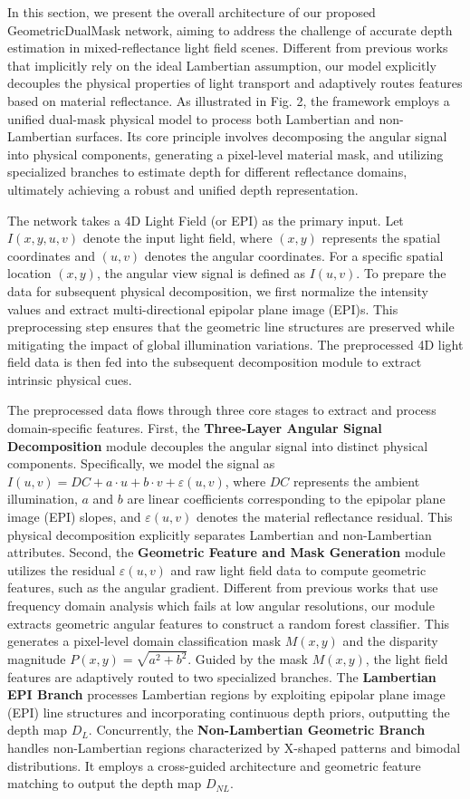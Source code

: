 \documentclass[lettersize,journal]{IEEEtran}
\begin{document}
In this section, we present the overall architecture of our proposed GeometricDualMask network, aiming to address the challenge of accurate depth estimation in mixed-reflectance light field scenes. Different from previous works that implicitly rely on the ideal Lambertian assumption, our model explicitly decouples the physical properties of light transport and adaptively routes features based on material reflectance. As illustrated in Fig. 2, the framework employs a unified dual-mask physical model to process both Lambertian and non-Lambertian surfaces. Its core principle involves decomposing the angular signal into physical components, generating a pixel-level material mask, and utilizing specialized branches to estimate depth for different reflectance domains, ultimately achieving a robust and unified depth representation.

The network takes a 4D Light Field (or EPI) as the primary input. Let $I(x,y,u,v)$ denote the input light field, where $(x,y)$ represents the spatial coordinates and $(u,v)$ denotes the angular coordinates. For a specific spatial location $(x,y)$, the angular view signal is defined as $I(u,v)$. To prepare the data for subsequent physical decomposition, we first normalize the intensity values and extract multi-directional epipolar plane image (EPI)s. This preprocessing step ensures that the geometric line structures are preserved while mitigating the impact of global illumination variations. The preprocessed 4D light field data is then fed into the subsequent decomposition module to extract intrinsic physical cues.

The preprocessed data flows through three core stages to extract and process domain-specific features. First, the \textbf{Three-Layer Angular Signal Decomposition} module decouples the angular signal into distinct physical components. Specifically, we model the signal as $I(u,v) = DC + a \cdot u + b \cdot v + \varepsilon(u,v)$, where $DC$ represents the ambient illumination, $a$ and $b$ are linear coefficients corresponding to the epipolar plane image (EPI) slopes, and $\varepsilon(u,v)$ denotes the material reflectance residual. This physical decomposition explicitly separates Lambertian and non-Lambertian attributes. Second, the \textbf{Geometric Feature and Mask Generation} module utilizes the residual $\varepsilon(u,v)$ and raw light field data to compute geometric features, such as the angular gradient. Different from previous works that use frequency domain analysis which fails at low angular resolutions, our module extracts geometric angular features to construct a random forest classifier. This generates a pixel-level domain classification mask $M(x,y)$ and the disparity magnitude $P(x,y) = \sqrt{a^2+b^2}$. Guided by the mask $M(x,y)$, the light field features are adaptively routed to two specialized branches. The \textbf{Lambertian EPI Branch} processes Lambertian regions by exploiting epipolar plane image (EPI) line structures and incorporating continuous depth priors, outputting the depth map $D_L$. Concurrently, the \textbf{Non-Lambertian Geometric Branch} handles non-Lambertian regions characterized by X-shaped patterns and bimodal distributions. It employs a cross-guided architecture and geometric feature matching to output the depth map $D_{NL}$.
\end{document}
